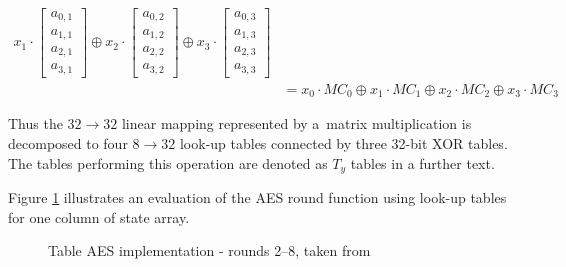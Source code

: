 \documentclass[11pt,oneside,final]{fithesis2}
\begin{document}
\begin{equation}
\begin{aligned}
		    x_1 \cdot \begin{bmatrix} a_{0,1} \\ a_{1,1} \\ a_{2,1} \\ a_{3,1} \end{bmatrix} \oplus
		    x_2 \cdot \begin{bmatrix} a_{0,2} \\ a_{1,2} \\ a_{2,2} \\ a_{3,2} \end{bmatrix} \oplus
		    x_3 \cdot \begin{bmatrix} a_{0,3} \\ a_{1,3} \\ a_{2,3} \\ a_{3,3} \end{bmatrix} \\
		 &= x_0 \cdot MC_0 \oplus 
		    x_1 \cdot MC_1 \oplus 
		    x_2 \cdot MC_2 \oplus 
		    x_3 \cdot MC_3
    \end{aligned}
    \end{equation}
    
    Thus the $32\rightarrow32$ linear mapping represented by a~matrix multiplication is decomposed to four $8\rightarrow32$ look-up tables
    connected by three 32-bit XOR tables. The tables performing this operation are denoted as $T_y$ tables in a further text.

    Figure \ref{fig:table_aes} illustrates an evaluation of the AES round function using look-up tables for one column of state array.

    \begin{figure}[!htb]
    \begin{center}
    \leavevmode
    \centerline{}
    \end{center}
    \caption{Table AES implementation - rounds 2--8, taken from~\citep{Muir_atutorial}}
    \label{fig:table_aes}
    \end{figure}
    
\end{document}
